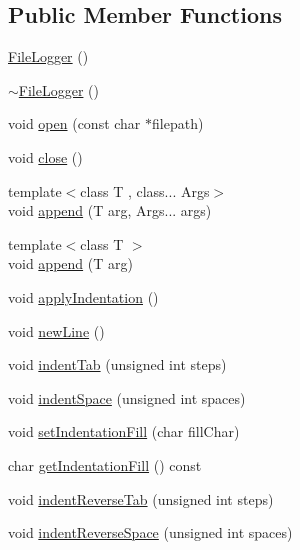 \subsection*{Public Member Functions}
\begin{DoxyCompactItemize}
\item 
\mbox{\hyperlink{classec_1_1_file_logger_a642ccd2a0b9a9097dc84c758b8c368ce}{File\+Logger}} ()
\item 
\mbox{\hyperlink{classec_1_1_file_logger_af39ff1796d10ce0bb086456560c9424b}{$\sim$\+File\+Logger}} ()
\item 
void \mbox{\hyperlink{classec_1_1_file_logger_a5229bec7b392fb723188f80b8c4a776c}{open}} (const char $\ast$filepath)
\item 
void \mbox{\hyperlink{classec_1_1_file_logger_a321a9f4c5f88196ae6986d9665b4a3f0}{close}} ()
\item 
{\footnotesize template$<$class T , class... Args$>$ }\\void \mbox{\hyperlink{classec_1_1_file_logger_a162e3ff242935c9f207a3c1ef6fc1ce7}{append}} (T arg, Args... args)
\item 
{\footnotesize template$<$class T $>$ }\\void \mbox{\hyperlink{classec_1_1_file_logger_a69b39b1cd6acadbbcd31ec88a5521108}{append}} (T arg)
\item 
void \mbox{\hyperlink{classec_1_1_file_logger_ac7fa97913098a4de47e798b89fb3278d}{apply\+Indentation}} ()
\item 
void \mbox{\hyperlink{classec_1_1_file_logger_ae0cb2d06dd86b4fcf4ac89679cfed259}{new\+Line}} ()
\item 
void \mbox{\hyperlink{classec_1_1_file_logger_a34e966f9fb6c8673f4dfb5ef0155e5e1}{indent\+Tab}} (unsigned int steps)
\item 
void \mbox{\hyperlink{classec_1_1_file_logger_aa705dc0302f3d829b87a11a78ef0e125}{indent\+Space}} (unsigned int spaces)
\item 
void \mbox{\hyperlink{classec_1_1_file_logger_a0f72344088c99f361686282828898d25}{set\+Indentation\+Fill}} (char fill\+Char)
\item 
char \mbox{\hyperlink{classec_1_1_file_logger_a925041f20e50638c9e0df366c86f6c00}{get\+Indentation\+Fill}} () const
\item 
void \mbox{\hyperlink{classec_1_1_file_logger_a4b337d503783a7082a2583111afe9f5b}{indent\+Reverse\+Tab}} (unsigned int steps)
\item 
void \mbox{\hyperlink{classec_1_1_file_logger_a34e543d95176d0b64f7ad7adcca6d4ae}{indent\+Reverse\+Space}} (unsigned int spaces)

\end{DoxyCompactItemize}
